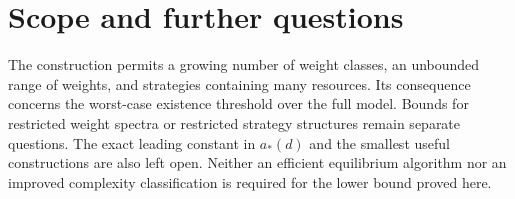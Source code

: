\documentclass[11pt]{article}
\theoremstyle{definition}
\theoremstyle{remark}
\begin{document}
\section{Scope and further questions}
The construction permits a growing number of weight classes, an unbounded range of weights, and strategies containing many resources. Its consequence concerns the worst-case existence threshold over the full model. Bounds for restricted weight spectra or restricted strategy structures remain separate questions. The exact leading constant in $a_*(d)$ and the smallest useful constructions are also left open. Neither an efficient equilibrium algorithm nor an improved complexity classification is required for the lower bound proved here.



\end{document}
